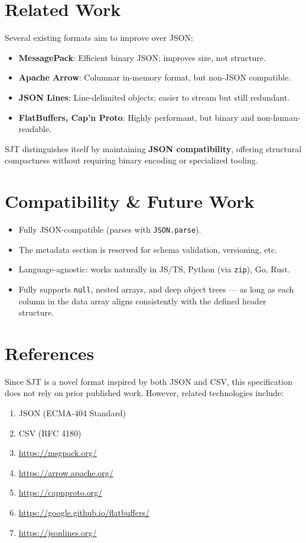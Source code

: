 \documentclass[12pt]{article}
\begin{document}
\section{Related Work}
Several existing formats aim to improve over JSON:

\begin{itemize}
  \item \textbf{MessagePack}: Efficient binary JSON; improves size, not structure.
  \item \textbf{Apache Arrow}: Columnar in-memory format, but non-JSON compatible.
  \item \textbf{JSON Lines}: Line-delimited objects; easier to stream but still redundant.
  \item \textbf{FlatBuffers, Cap’n Proto}: Highly performant, but binary and non-human-readable.
\end{itemize}

SJT distinguishes itself by maintaining \textbf{JSON compatibility}, offering structural compactness without requiring binary encoding or specialized tooling.
\clearpage
\section{Compatibility \& Future Work}
\begin{itemize}
  \item Fully JSON-compatible (parses with \texttt{JSON.parse}).
  \item The metadata section is reserved for schema validation, versioning, etc.
  \item Language-agnostic: works naturally in JS/TS, Python (via \texttt{zip}), Go, Rust.
  \item Fully supports \texttt{null}, nested arrays, and deep object trees --- as long as each column in the data array aligns consistently with the defined header structure.
\end{itemize}
\section{References}
Since SJT is a novel format inspired by both JSON and CSV, this specification does not rely on prior published work. However, related technologies include:

\begin{enumerate}
  \item JSON (ECMA-404 Standard)
  \item CSV (RFC 4180)
  \item \url{https://msgpack.org/}
  \item \url{https://arrow.apache.org/}
  \item \url{https://capnproto.org/}
  \item \url{https://google.github.io/flatbuffers/}
  \item \url{https://jsonlines.org/}
\end{enumerate}
\end{document}
